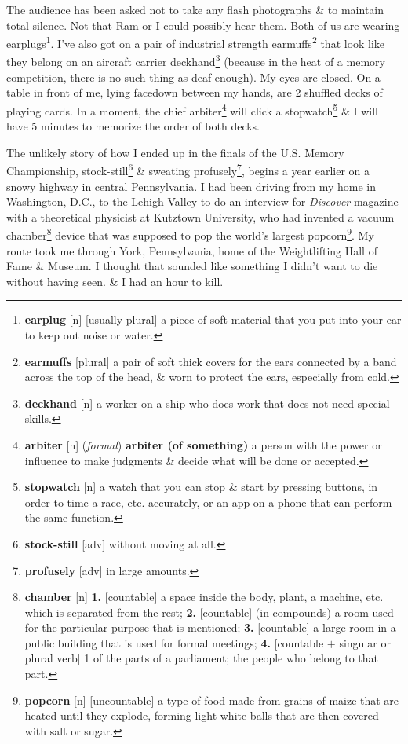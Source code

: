 \documentclass[oneside]{book}
\numberwithin{equation}{section}
\begin{document}
The audience has been asked not to take any flash photographs \& to maintain total silence. Not that Ram or I could possibly hear them. Both of us are wearing earplugs\footnote{\textbf{earplug} [n] [usually plural] a piece of soft material that you put into your ear to keep out noise or water.}. I've also got on a pair of industrial strength earmuffs\footnote{\textbf{earmuffs} [plural] a pair of soft thick covers for the ears connected by a band across the top of the head, \& worn to protect the ears, especially from cold.} that look like they belong on an aircraft carrier deckhand\footnote{\textbf{deckhand} [n] a worker on a ship who does work that does not need special skills.} (because in the heat of a memory competition, there is no such thing as deaf enough). My eyes are closed. On a table in front of me, lying facedown between my hands, are 2 shuffled decks of playing cards. In a moment, the chief arbiter\footnote{\textbf{arbiter} [n] (\textit{formal}) \textbf{arbiter (of something)} a person with the power or influence to make judgments \& decide what will be done or accepted.} will click a stopwatch\footnote{\textbf{stopwatch} [n] a watch that you can stop \& start by pressing buttons, in order to time a race, etc. accurately, or an app on a phone that can perform the same function.} \& I will have 5 minutes to memorize the order of both decks.

The unlikely story of how I ended up in the finals of the U.S. Memory Championship, stock-still\footnote{\textbf{stock-still} [adv] without moving at all.} \& sweating profusely\footnote{\textbf{profusely} [adv] in large amounts.}, begins a year earlier on a snowy highway in central Pennsylvania. I had been driving from my home in Washington, D.C., to the Lehigh Valley to do an interview for \textit{Discover} magazine with a theoretical physicist at Kutztown University, who had invented a vacuum chamber\footnote{\textbf{chamber} [n] \textbf{1.} [countable] a space inside the body, plant, a machine, etc. which is separated from the rest; \textbf{2.} [countable] (in compounds) a room used for the particular purpose that is mentioned; \textbf{3.} [countable] a large room in a public building that is used for formal meetings; \textbf{4.} [countable $+$ singular or plural verb] 1 of the parts of a parliament; the people who belong to that part.} device that was supposed to pop the world's largest popcorn\footnote{\textbf{popcorn} [n] [uncountable] a type of food made from grains of maize that are heated until they explode, forming light white balls that are then covered with salt or sugar.}. My route took me through York, Pennsylvania, home of the Weightlifting Hall of Fame \& Museum. I thought that sounded like something I didn't want to die without having seen. \& I had an hour to kill.
\end{document}
